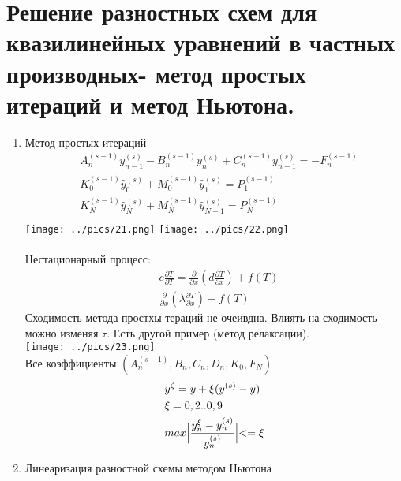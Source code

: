 \documentclass[12pt,a4paper]{article}
\begin{document}
	\section{Решение разностных схем для квазилинейных уравнений в частных производных- метод простых итераций и метод Ньютона.}
		\begin{enumerate}
		\item Метод простых итераций\\
		\begin{align*}
		&A^{(s-1)}_n y^{(s)}_{n-1} - B^{(s-1)}_n y^{(s)}_n + C^{(s-1)}_n y^{(s)}_{n+1} = -F^{(s-1)}_n\\
		&K^{(s-1)}_0 \hat{y}^{(s)}_0 + M^{(s-1)}_0 \hat{y}^{(s)}_1 = P^{(s-1)}_1\\
		&K^{(s-1)}_N \hat{y}^{(s)}_N + M^{(s-1)}_N \hat{y}^{(s)}_{N-1} = P^{(s-1)}_N\\
		\end{align*}
		\texttt{[image: ../pics/21.png]}
		\texttt{[image: ../pics/22.png]}\\\\
		Нестационарный процесс:\\
		\begin{align*}
		&c\frac{\partial T}{\partial T} = \frac{\partial}{\partial x}\left( d \frac{\partial T}{\partial x} \right) + f(T)\\
		&\frac{\partial}{\partial x}\left( \lambda \frac{\partial T}{\partial x}  \right)	+ f(T)
		\end{align*}
		Сходимость метода простхы тераций не очеивдна. Влиять на сходимость можно изменяя $\tau$. Есть другой пример (метод релаксации).\\
		\texttt{[image: ../pics/23.png]}\\
		Все коэффициенты $(A^{(s-1)}_n, B_n, C_n, D_n, K_0, F_N)$\\
		\begin{align*}
		&y^{\zeta} = y + \xi(y^{(s)} - y)\\
		&\xi = 0,2 .. 0,9\\
		& max \Bigl| \frac{y^{\xi}_n - y^{(s)}_n}{y^{(s)}_n} \Bigl|<= \xi
		\end{align*}
		\item Линеаризация разностной схемы методом Ньютона


\end{enumerate}
\end{document}
